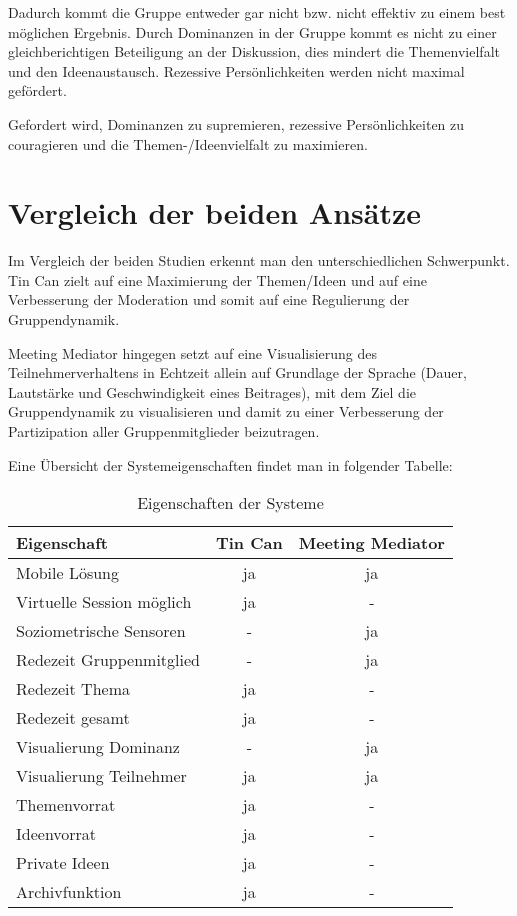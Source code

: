 \documentclass{seminarvorlage}
\begin{document}
Dadurch kommt die Gruppe entweder gar nicht bzw. nicht effektiv zu einem best
möglichen Ergebnis. Durch Dominanzen in der Gruppe kommt es nicht zu einer
gleichberichtigen Beteiligung an der Diskussion, dies mindert die Themenvielfalt
und den Ideenaustausch. Rezessive Persönlichkeiten werden nicht maximal
gefördert.

Gefordert wird, Dominanzen zu supremieren, rezessive Per\-sön\-lich\-keit\-en
zu couragieren und die Themen-/Ideenvielfalt zu maximieren.




\section{Vergleich der beiden Ansätze}
Im Vergleich der beiden Studien erkennt man den unterschiedlichen Schwerpunkt.
Tin Can zielt auf eine Maximierung der Themen/Ideen und auf eine Verbesserung
der Moderation und somit auf eine Regulierung der Gruppendynamik.

Meeting Mediator hingegen setzt auf eine Visualisierung des Teilnehmerverhaltens
in Echtzeit allein auf Grundlage der Sprache (Dauer, Lautstärke und
Geschwindigkeit eines Beitrages), mit dem Ziel die Gruppendynamik zu
visualisieren und damit zu einer Verbesserung der Partizipation aller
Gruppenmitglieder beizutragen.

Eine Übersicht der Systemeigenschaften findet man in folgender Tabelle:

\begin{table}[h]
\begin{tabular}{ l | c | c }
  Eigenschaft & Tin Can & Meeting Mediator \\
  \hline
  Mobile Lösung & ja & ja \\
  Virtuelle Session möglich & ja & - \\
  Soziometrische Sensoren & - & ja \\
  \hline
  Redezeit Gruppenmitglied & - & ja \\
  Redezeit Thema  & ja & - \\
  Redezeit gesamt & ja & - \\
  \hline
  
  Visualierung Dominanz & - & ja \\
  Visualierung Teilnehmer & ja & ja \\
  \hline
  Themenvorrat & ja & - \\
  Ideenvorrat & ja & - \\
  Private Ideen & ja & - \\
  Archivfunktion & ja & - \\
  

\end{tabular}
\caption{Eigenschaften der Systeme}
\end{table}
\end{document}
